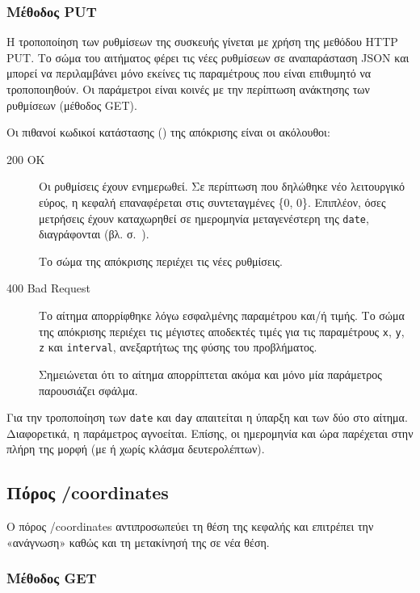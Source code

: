 \subsubsection{Μέθοδος PUT}


Η τροποποίηση των ρυθμίσεων της συσκευής γίνεται με χρήση της μεθόδου HTTP PUT.
Το σώμα του αιτήματος φέρει τις νέες ρυθμίσεων σε αναπαράσταση JSON και μπορεί
να περιλαμβάνει μόνο εκείνες τις παραμέτρους που είναι επιθυμητό να
τροποποιηθούν. Οι παράμετροι είναι κοινές με την περίπτωση ανάκτησης των
ρυθμίσεων (μέθοδος GET).

Οι πιθανοί κωδικοί κατάστασης () της απόκρισης είναι οι
ακόλουθοι:
\begin{description}
    \item[200 OK] Οι ρυθμίσεις έχουν ενημερωθεί. Σε περίπτωση που δηλώθηκε νέο
    λειτουργικό εύρος, η κεφαλή επαναφέρεται στις συντεταγμένες \{0, 0\}.
    Επιπλέον, όσες μετρήσεις έχουν καταχωρηθεί σε ημερομηνία μεταγενέστερη της
    \verb~date~, διαγράφονται (βλ. 
    σ.~\pageref{ssubsec:log:linear}).

    Το σώμα της απόκρισης περιέχει τις νέες ρυθμίσεις.

    \item[400 Bad Request] Το αίτημα απορρίφθηκε λόγω εσφαλμένης παραμέτρου
    και\slash{}ή τιμής. Το σώμα της απόκρισης περιέχει τις μέγιστες αποδεκτές
    τιμές για τις παραμέτρους \verb~x~, \verb~y~, \verb~z~ και \verb~interval~,
    ανεξαρτήτως της φύσης του προβλήματος.

    Σημειώνεται ότι το αίτημα απορρίπτεται ακόμα και μόνο μία παράμετρος
    παρουσιάζει σφάλμα.
\end{description}

Για την τροποποίηση των \verb~date~ και \verb~day~ απαιτείται η ύπαρξη και των
δύο στο αίτημα. Διαφορετικά, η παράμετρος αγνοείται. Επίσης, οι ημερομηνία και
ώρα παρέχεται στην πλήρη της μορφή (με ή χωρίς κλάσμα δευτερολέπτων).


\subsection{Πόρος /coordinates}

Ο πόρος /coordinates αντιπροσωπεύει τη θέση της κεφαλής και επιτρέπει την
«ανάγνωση» καθώς και τη μετακίνησή της σε νέα θέση.


\subsubsection{Μέθοδος GET}

